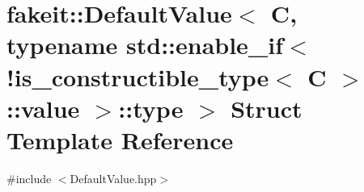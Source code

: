 \hypertarget{structfakeit_1_1DefaultValue_3_01C_00_01typename_01std_1_1enable__if_3_9is__constructible__type_237d75e2cfb810085e1504a1340d5949}{}\section{fakeit\+::Default\+Value$<$ C, typename std\+::enable\+\_\+if$<$!is\+\_\+constructible\+\_\+type$<$ C $>$\+::value $>$\+::type $>$ Struct Template Reference}
\label{structfakeit_1_1DefaultValue_3_01C_00_01typename_01std_1_1enable__if_3_9is__constructible__type_237d75e2cfb810085e1504a1340d5949}


{\ttfamily \#include $<$Default\+Value.\+hpp$>$}

